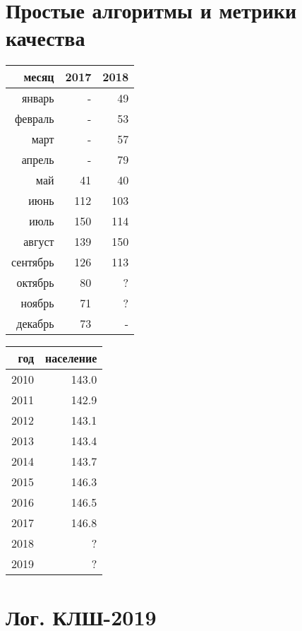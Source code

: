\documentclass[12pt]{article}
\theoremstyle{definition}
\begin{document}
\setcounter{section}{0}
\section{Простые алгоритмы и метрики качества}

\begin{multicols}{2}
\begin{tabular}{rrr}
  \toprule
  месяц & 2017 & 2018 \\
  \midrule
  январь & - & 49 \\
  февраль & - & 53 \\
  март & - & 57 \\
  апрель & - & 79 \\
  май & 41 & 40 \\
  июнь & 112 & 103 \\
  июль & 150 & 114 \\
  август  & 139 & 150 \\
  сентябрь  & 126 & 113 \\
  октябрь  & 80 & ? \\
  ноябрь  & 71 & ? \\
  декабрь  & 73 & - \\
  \bottomrule
\end{tabular}


\begin{tabular}{rr}
  \toprule
  год & население  \\
  \midrule
  2010 & 143.0 \\
  2011 & 142.9 \\
  2012 & 143.1 \\
  2013 & 143.4 \\
  2014 & 143.7 \\
  2015 & 146.3\\
  2016 & 146.5 \\
  2017 & 146.8 \\
  2018 & ? \\
  2019 & ? \\
  \bottomrule
\end{tabular}

\end{multicols}







\newpage

\section{Лог. КЛШ-2019}
\end{document}
